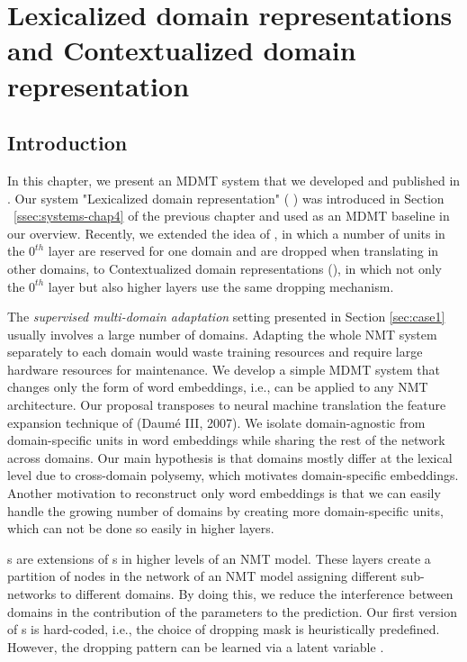 \chapter{Lexicalized domain representations and Contextualized domain representation}
\label{chap:ldr}
\section{Introduction}
In this chapter, we present an MDMT system that we developed and published in \citet{Pham19generic}. Our system "Lexicalized domain representation" ( ) was introduced in Section ~\ref{ssec:systems-chap4} of the previous chapter and used as an MDMT baseline in our overview. Recently, we extended the idea of , in which a number of units in the $0^{th}$ layer are reserved for one domain and are dropped when translating in other domains, to Contextualized domain representations (), in which not only the $0^{th}$ layer but also higher layers use the same dropping mechanism.

The \emph{supervised multi-domain adaptation} setting presented in Section \ref{sec:case1} usually involves a large number of domains. Adapting the whole NMT system separately to each domain would waste training resources and require large hardware resources for maintenance. We develop a simple MDMT system that changes only the form of word embeddings, i.e., can be applied to any NMT architecture. Our proposal transposes to neural machine translation the feature expansion technique of (Daum\'e III, 2007). We isolate domain-agnostic from domain-specific units in word embeddings while sharing the rest of the network across domains. Our main hypothesis is that domains mostly differ at the lexical level due to cross-domain polysemy, which motivates domain-specific embeddings. Another motivation to reconstruct only word embeddings is that we can easily handle the growing number of domains by creating more domain-specific units, which can not be done so easily in higher layers.

s are extensions of s in higher levels of an NMT model. These layers create a partition of nodes in the network of an NMT model assigning different sub-networks to different domains. By doing this, we reduce the interference between domains in the contribution of the parameters to the prediction. Our first version of s is hard-coded, i.e., the choice of dropping mask is heuristically predefined. However, the dropping pattern can be learned via a latent variable \citet{Gong21pay,Gong21adaptive}.
 
